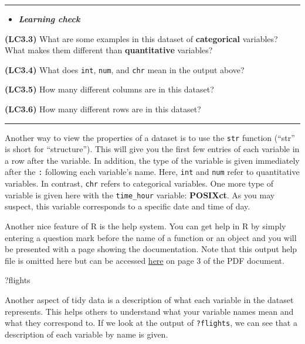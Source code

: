 \documentclass[]{tufte-book}
\newenvironment{Shaded}{\begin{snugshade}}{\end{snugshade}}
\newcommand{\NormalTok}[1]{{#1}}
\let\oldrule=\rule
\renewcommand{\rule}[1]{\oldrule{\linewidth}}
\newenvironment{rmdblock}[1]
  {\begin{shaded*}
  \begin{itemize}
  \renewcommand{\labelitemi}{
    \raisebox{-.7\height}[0pt][0pt]{
    }
  }
  \item
  }
  {
  \end{itemize}
  \end{shaded*}
  }
\newenvironment{learncheck}
  {\begin{rmdblock}{warning}}
  {\end{rmdblock}}
\begin{document}
\begin{center}\rule{0.5\linewidth}{\linethickness}\end{center}

\begin{learncheck}
\textbf{\emph{Learning check}}
\end{learncheck}

\textbf{(LC3.3)} What are some examples in this dataset of
\textbf{categorical} variables? What makes them different than
\textbf{quantitative} variables?

\textbf{(LC3.4)} What does \texttt{int}, \texttt{num}, and \texttt{chr}
mean in the output above?

\textbf{(LC3.5)} How many different columns are in this dataset?

\textbf{(LC3.6)} How many different rows are in this dataset?

\begin{center}\rule{0.5\linewidth}{\linethickness}\end{center}

Another way to view the properties of a dataset is to use the
\texttt{str} function (``str'' is short for ``structure''). This will
give you the first few entries of each variable in a row after the
variable. In addition, the type of the variable is given immediately
after the \texttt{:} following each variable's name. Here, \texttt{int}
and \texttt{num} refer to quantitative variables. In contrast,
\texttt{chr} refers to categorical variables. One more type of variable
is given here with the \texttt{time\_hour} variable: \textbf{POSIXct}.
As you may suspect, this variable corresponds to a specific date and
time of day.

Another nice feature of R is the help system. You can get help in R by
simply entering a question mark before the name of a function or an
object and you will be presented with a page showing the documentation.
Note that this output help file is omitted here but can be accessed
\href{https://cran.r-project.org/web/packages/nycflights13/nycflights13.pdf}{here}
on page 3 of the PDF document.

\begin{Shaded}
\begin{Highlighting}[]
\NormalTok{?flights}
\end{Highlighting}
\end{Shaded}

Another aspect of tidy data is a description of what each variable in
the dataset represents. This helps others to understand what your
variable names mean and what they correspond to. If we look at the
output of \texttt{?flights}, we can see that a description of each
variable by name is given.
\end{document}
